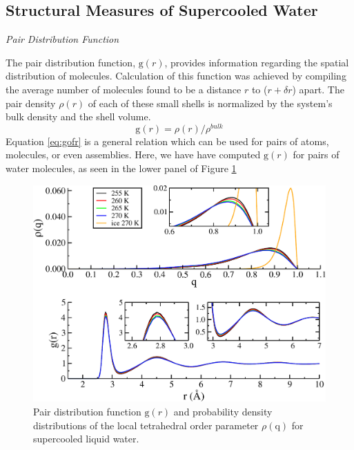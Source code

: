 \subsection{Structural Measures of Supercooled Water}

\begin{flushleft}
\textit{Pair Distribution Function}
\end{flushleft}

The pair distribution function, $\mathrm{g}(r)$, provides information
regarding the spatial distribution of molecules. Calculation of this
function was achieved by compiling the average number of molecules
found to be a distance $r$ to ($r + \delta r$) apart. The
pair density $\rho (r)$ of each of these small shells is normalized by
the system's bulk density and the shell volume.
\begin{equation}\label{eq:gofr}
\mathrm{g}(r) = \rho(r) / \rho^{bulk}
\end{equation}
Equation \eqref{eq:gofr} is a general relation which can be used for
pairs of atoms, molecules, or even assemblies. Here, we have have
computed $\mathrm{g}(r)$ for pairs of water molecules, as
seen in the lower panel of Figure \ref{fig:gofrQ}

\begin{figure}
\includegraphics[width=\linewidth]{Figures/bulk_GofrQdens}
\caption{\label{fig:gofrQ} Pair distribution function
  $\mathrm{g}(r)$ and probability density distributions of
  the local tetrahedral order parameter $\rho (\mathrm{q})$ for
  supercooled liquid water.
}
\end{figure}  

